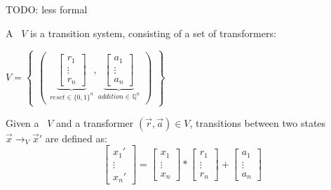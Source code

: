 \begin{frame}[t]
	\frametitle{\qvasr}
	TODO: less formal
	\begin{definition}
		A \qvasr\ $V$ is a transition system, consisting of a set of transformers: \\
		\begin{center}
			$ V = 
			\begin{Bmatrix}
				\begin{pmatrix}
					\underbrace{
						\begin{bmatrix}
							r_1 \\
							\vdots \\
							r_n
					\end{bmatrix}}_{reset \in \{0,1\}^n},
					\underbrace{
						\begin{bmatrix}
							a_1 \\
							\vdots \\
							a_n
					\end{bmatrix}}_{addition \in \mathbb{Q}^n}
				\end{pmatrix}
			\end{Bmatrix}
			$
		\end{center}
	\end{definition}
	\begin{definition}
		Given a \qvasr\ $V$ and a transformer $(\vec{r}, \vec{a}) \in V$, transitions between two states $\vec{x} \rightarrow_V \vec{x}'$ are defined as: \\
		\begin{equation*}
			\begin{bmatrix}
				x_1' \\
				\vdots \\
				x_n'
			\end{bmatrix}
			=
			\begin{bmatrix}
				x_1 \\
				\vdots \\
				x_n
			\end{bmatrix}
			*
			\begin{bmatrix}
				r_1 \\
				\vdots \\
				r_n
			\end{bmatrix}
			+
			\begin{bmatrix}
				a_1 \\
				\vdots \\
				a_n
			\end{bmatrix}		
		\end{equation*}
	\end{definition}
\end{frame}